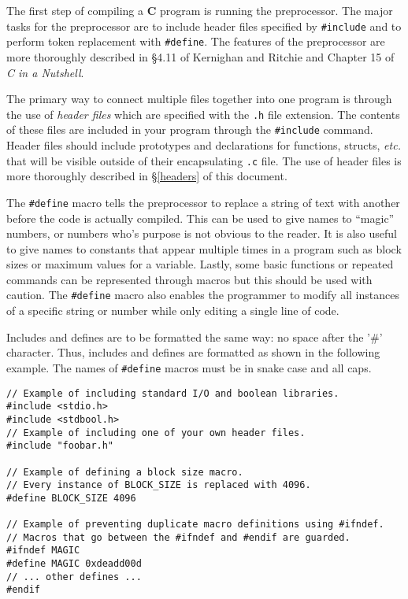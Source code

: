 \documentclass[11pt]{article}
\begin{document}
\noindent
The first step of compiling a \textbf{C} program is running the preprocessor.
The major tasks for the preprocessor are to include header files specified by
\texttt{\#include} and to perform token replacement with \texttt{\#define}.
The features of the preprocessor are more thoroughly described
in \S 4.11 of Kernighan and Ritchie and Chapter 15 of \emph{C in a Nutshell}.

The primary way to connect multiple files together into one program is through
the use of \emph{header files} which are specified with the \texttt{.h} file
extension. The contents of these files are included in your program through the
\texttt{\#include} command. Header files should include prototypes and declarations for
functions, structs, \emph{etc.} that will be visible outside of their
encapsulating \texttt{.c} file. The use of header files is more thoroughly
described in \S \ref{headers} of this document.

The \texttt{\#define} macro tells the preprocessor to replace a string of text
with another before the code is actually compiled. This can be used to give names
to ``magic'' numbers, or numbers who's purpose is not obvious to the reader.
It is also useful to give names to constants that appear multiple times in a
program such as block sizes or maximum values for a variable. Lastly, some basic
functions or repeated commands can be represented through macros but this should
be used with caution. The \texttt{\#define} macro also enables
the programmer to modify all instances of a specific string or number while only
editing a single line of code.

Includes and defines are to be formatted the same way: no space after
the '\#' character. Thus, includes and defines are formatted as shown in the
following example. The names of \texttt{\#define} macros must be in snake case
and all caps.

\begin{lstlisting}
// Example of including standard I/O and boolean libraries.
#include <stdio.h>
#include <stdbool.h>
// Example of including one of your own header files.
#include "foobar.h"

// Example of defining a block size macro.
// Every instance of BLOCK_SIZE is replaced with 4096.
#define BLOCK_SIZE 4096

// Example of preventing duplicate macro definitions using #ifndef.
// Macros that go between the #ifndef and #endif are guarded.
#ifndef MAGIC
#define MAGIC 0xdeadd00d
// ... other defines ...
#endif
\end{lstlisting}
\end{document}

